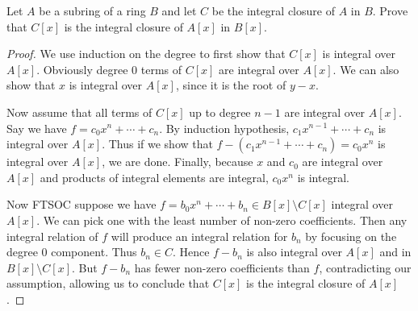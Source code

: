 \begin{exercise}
	Let $A$ be a subring of a ring $B$ and let $C$ be the integral closure of $A$ in $B$. Prove that $C[x]$ is the integral closure of $A[x]$ in $B[x]$.
\end{exercise}
\begin{proof}
	We use induction on the degree to first show that $C[x] $ is integral over $A[x] $.
	Obviously degree 0 terms of $C[x] $ are integral over $A[x] $.
	We can also show that $x $ is integral over $A[x] $, since it is the root of $y - x $.

	Now assume that all terms of $C[x] $ up to degree $n-1 $ are integral over $A[x] $.
	Say we have $f = c_{0}x^n + \cdots + c_n $.
	By induction hypothesis, $c_{1}x^{n-1} + \cdots + c_n $ is integral over $A[x] $.
	Thus if we show that $f - (c_{1}x^{n-1} + \cdots + c_n) = c_{0}x^n $ is integral over $A[x]$, we are done.
	Finally, because $x $ and $c_{0} $ are integral over $A[x] $ and products of integral elements are integral, $c_{0}x^n $ is integral.

	Now FTSOC suppose we have $f = b_{0}x^n + \cdots + b_n \in B[x] \setminus C[x]$ integral over $A[x] $.
	We can pick one with the least number of non-zero coefficients.
	Then any integral relation of $f $ will produce an integral relation for $b_n $ by focusing on the degree 0 component.
	Thus $b_n \in C $.
	Hence $f-b_n $ is also integral over $A[x] $ and in $B[x] \setminus C[x] $.
	But $f-b_n $ has fewer non-zero coefficients than $f $, contradicting our assumption, allowing us to conclude that $C[x] $ is the integral closure of $A[x] $.
\end{proof}
